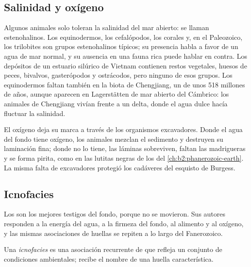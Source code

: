 \subsection*{Salinidad y oxígeno}

Algunos animales solo toleran la salinidad del mar abierto: se llaman estenohalinos. Los equinodermos,
los cefalópodos, los corales y, en el Paleozoico, los trilobites son grupos estenohalinos típicos; su
presencia habla a favor de un agua de mar normal, y su ausencia en una fauna rica puede hablar en contra.
Los depósitos de un estuario silúrico de Vietnam contienen restos vegetales, huesos de peces, bivalvos, gasterópodos
y ostrácodos, pero ninguno de esos grupos. Los equinodermos faltan también en la biota de Chengjiang,
un  de unos 518 millones de años, aunque aparecen en Lagerstätten de mar abierto del
Cámbrico: los animales de Chengjiang vivían frente a un delta, donde el agua dulce hacía fluctuar la salinidad.

El oxígeno deja su marca a través de los organismos excavadores. Donde el agua del fondo tiene oxígeno, los animales mezclan el
sedimento y destruyen su laminación fina; donde no lo tiene, las láminas sobreviven, faltan las madrigueras
y se forma pirita, como en las lutitas negras de los  del
\cref{ch:b2:phanerozoic-earth}. La misma falta de excavadores protegió los cadáveres del esquisto de
Burgess.

\subsection*{Icnofacies}

Los  son los mejores testigos del fondo, porque no se movieron. Sus autores
responden a la energía del agua, a la firmeza del fondo, al alimento y al oxígeno, y las
mismas asociaciones de huellas se repiten a lo largo del Fanerozoico.

\begin{definition}[Icnofacies]\label{def:b2:palaeoenvironments:ichnofacies}
Una \emph{icnofacies} es una asociación recurrente de  que
refleja un conjunto de condiciones ambientales; recibe el nombre de una huella característica.
\end{definition}


